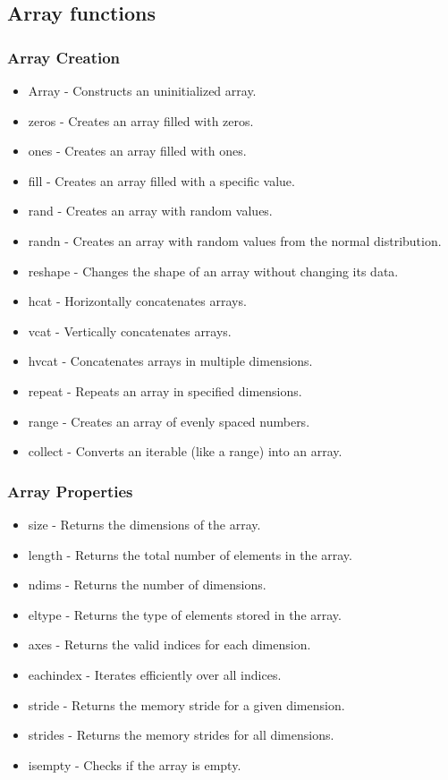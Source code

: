 \documentclass{report}
\begin{document}
    



    \bigbreak \noindent 
    \subsection{Array functions}
    \bigbreak \noindent 
    \subsubsection{ Array Creation}
    \begin{itemize}
        \item Array - Constructs an uninitialized array.
        \item zeros - Creates an array filled with zeros.
        \item ones - Creates an array filled with ones.
        \item fill - Creates an array filled with a specific value.
        \item rand - Creates an array with random values.
        \item randn - Creates an array with random values from the normal distribution.
        \item reshape - Changes the shape of an array without changing its data.
        \item hcat - Horizontally concatenates arrays.
        \item vcat - Vertically concatenates arrays.
        \item hvcat - Concatenates arrays in multiple dimensions.
        \item repeat - Repeats an array in specified dimensions.
        \item range - Creates an array of evenly spaced numbers.
        \item collect - Converts an iterable (like a range) into an array.
    \end{itemize}

    \bigbreak \noindent 
    \subsubsection{Array Properties}
\begin{itemize}
        \item size - Returns the dimensions of the array.
        \item length - Returns the total number of elements in the array.
        \item ndims - Returns the number of dimensions.
        \item eltype - Returns the type of elements stored in the array.
        \item axes - Returns the valid indices for each dimension.
        \item eachindex - Iterates efficiently over all indices.
        \item stride - Returns the memory stride for a given dimension.
        \item strides - Returns the memory strides for all dimensions.
        \item isempty - Checks if the array is empty.
    \end{itemize}
\end{document}
